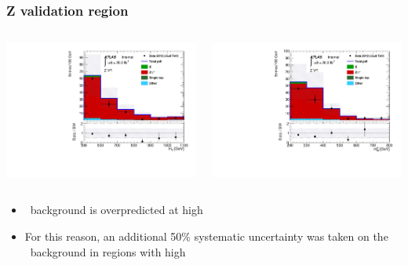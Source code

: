 \documentclass[10pt, svgnames]{beamer}
\begin{document}
\begin{frame}
  \frametitle{Z validation region}
  \begin{columns}
    \begin{block}{\HT}
      \includegraphics[width=\textwidth]{figures/vr_Z_ht_signal.pdf}
    \end{block}
    \begin{block}{\MBL}
      \includegraphics[width=\textwidth]{figures/vr_Z_mbl_0.pdf}
    \end{block}
  \end{columns}
  \begin{itemize}
    \item \ZGAMMA\ background is overpredicted at high \HT
    \item For this reason, an additional 50\% systematic uncertainty was taken
      on the \ZGAMMA\ background in regions with high \HT
  \end{itemize}
\end{frame}
\end{document}
